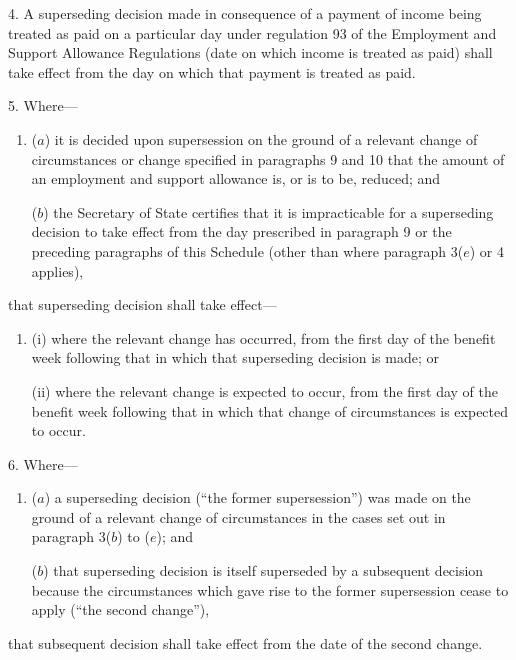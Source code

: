 \documentclass[12pt,a4paper]{article}
\begin{document}
\medskip

4.  A superseding decision made in consequence of a payment of income being treated as paid on a particular day under regulation 93 of the Employment and Support Allowance Regulations (date on which income is treated as paid) shall take effect from the day on which that payment is treated as paid.

\medskip

5.  Where—
\begin{enumerate}\item[]
($a$) it is decided upon supersession on the ground of a relevant change of circumstances or change specified in paragraphs 9 and 10 that the amount of an employment and support allowance is, or is to be, reduced; and

($b$) the Secretary of State certifies that it is impracticable for a superseding decision to take effect from the day prescribed in paragraph 9 or the preceding paragraphs of this Schedule (other than where paragraph 3($e$)  or 4 applies),
\end{enumerate}
that superseding decision shall take effect—
\begin{enumerate}\item[]
(i) where the relevant change has occurred, from the first day of the benefit week following that in which that superseding decision is made; or

(ii) where the relevant change is expected to occur, from the first day of the benefit week following that in which that change of circumstances is expected to occur.
\end{enumerate}

\medskip

6.  Where—
\begin{enumerate}\item[]
($a$) a superseding decision (“the former supersession”) was made on the ground of a relevant change of circumstances in the cases set out in paragraph 3($b$)  to ($e$); and

($b$) that superseding decision is itself superseded by a subsequent decision because the circumstances which gave rise to the former supersession cease to apply (“the second change”),
\end{enumerate}
that subsequent decision shall take effect from the date of the second change.

\medskip
\end{document}
